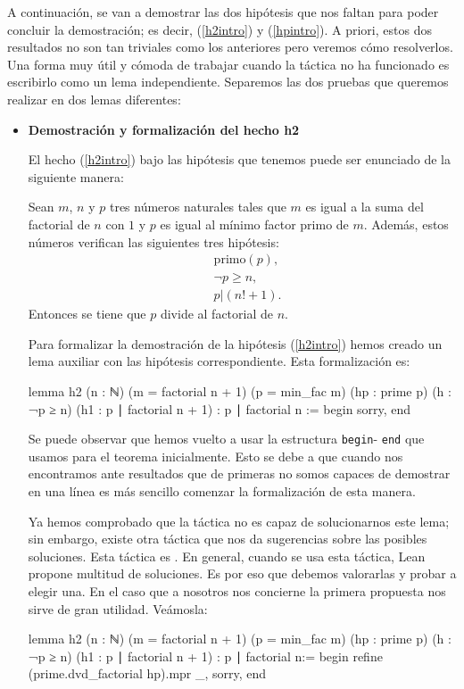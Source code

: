 A continuación, se van a demostrar las dos hipótesis que nos faltan para
poder concluir la demostración; es decir, (\ref{h2intro}) y (\ref{hpintro}).
A priori, estos dos resultados no son tan triviales como los anteriores pero
veremos cómo resolverlos. Una forma muy útil y cómoda de trabajar cuando la
táctica  no ha funcionado es escribirlo
como un lema independiente. Separemos las dos pruebas que queremos realizar en
dos lemas diferentes:
\begin{itemize}
\item \textbf{Demostración y formalización del hecho h2}

  El hecho (\ref{h2intro}) bajo las hipótesis que tenemos puede ser
  enunciado de la siguiente manera:
  \begin{lema}[h2]
    Sean \(m\), \(n\) y \(p\) tres números naturales tales que \(m\) es
    igual a la suma del factorial de \(n\) con \(1\) y \(p\) es igual al
    mínimo factor primo de \(m\). Además, estos números verifican las
    siguientes tres hipótesis:
    \begin{align}
      &\text{primo}(p),\label{hpintro}\tag{hp}\\
      &¬p ≥ n,         \tag{h}\label{hintro}\\
      &p | (n!+1).     \tag{h1}\label{h11intro}
    \end{align}
    Entonces se tiene que \(p\) divide al factorial de \(n\).
  \end{lema}

  Para formalizar la demostración de la hipótesis (\ref{h2intro}) hemos creado
  un lema auxiliar con las hipótesis correspondiente. Esta formalización es:
  \begin{leancode}
lemma h2
  (n : ℕ)
  (m = factorial n + 1)
  (p = min_fac m)
  (hp : prime p)
  (h : ¬p ≥ n)
  (h1 : p ∣ factorial n + 1)
  : p ∣ factorial n :=
  begin
    sorry,
end
  \end{leancode}

  Se puede observar que hemos vuelto a usar la estructura
  \texttt{begin}- \texttt{end} que usamos para el teorema
  inicialmente. Esto se debe a que cuando nos encontramos ante
  resultados que de primeras no somos capaces de demostrar en una línea
  es más sencillo comenzar la formalización de esta manera.

  Ya hemos comprobado que la táctica
   no es capaz de solucionarnos
  este lema; sin embargo, existe otra táctica que nos da sugerencias
  sobre las posibles soluciones. Esta táctica es
  . En general, cuando se usa esta táctica,
  Lean propone multitud de soluciones. Es por eso que debemos
  valorarlas y probar a elegir una. En el caso que a nosotros nos
  concierne la primera propuesta nos sirve de gran utilidad. Veámosla:
\begin{leancode}
lemma h2
  (n : ℕ)
  (m = factorial n + 1)
  (p = min_fac m)
  (hp : prime p)
  (h : ¬p ≥ n)
  (h1 : p ∣ factorial n + 1)
  : p ∣ factorial n:=
begin
  refine (prime.dvd_factorial hp).mpr _,
  sorry,
end
\end{leancode}


\end{itemize}
